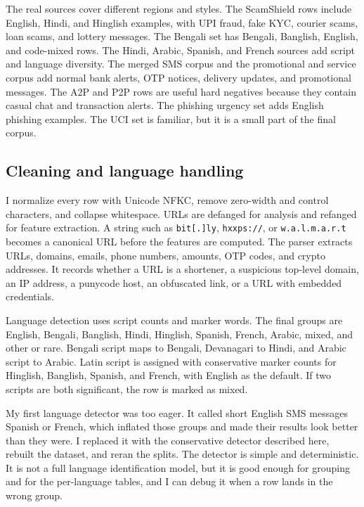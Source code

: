 \documentclass[11pt]{article}
\begin{document}
The real sources cover different regions and styles. The ScamShield rows include English, Hindi, and Hinglish examples, with UPI fraud, fake KYC, courier scams, loan scams, and lottery messages. The Bengali set has Bengali, Banglish, English, and code-mixed rows. The Hindi, Arabic, Spanish, and French sources add script and language diversity. The merged SMS corpus and the promotional and service corpus add normal bank alerts, OTP notices, delivery updates, and promotional messages. The A2P and P2P rows are useful hard negatives because they contain casual chat and transaction alerts. The phishing urgency set adds English phishing examples. The UCI set is familiar, but it is a small part of the final corpus.

\subsection{Cleaning and language handling}

I normalize every row with Unicode NFKC, remove zero-width and control characters, and collapse whitespace. URLs are defanged for analysis and refanged for feature extraction. A string such as \texttt{bit[.]ly}, \texttt{hxxps://}, or \texttt{w.a.l.m.a.r.t} becomes a canonical URL before the features are computed. The parser extracts URLs, domains, emails, phone numbers, amounts, OTP codes, and crypto addresses. It records whether a URL is a shortener, a suspicious top-level domain, an IP address, a punycode host, an obfuscated link, or a URL with embedded credentials.

Language detection uses script counts and marker words. The final groups are English, Bengali, Banglish, Hindi, Hinglish, Spanish, French, Arabic, mixed, and other or rare. Bengali script maps to Bengali, Devanagari to Hindi, and Arabic script to Arabic. Latin script is assigned with conservative marker counts for Hinglish, Banglish, Spanish, and French, with English as the default. If two scripts are both significant, the row is marked as mixed.

My first language detector was too eager. It called short English SMS messages Spanish or French, which inflated those groups and made their results look better than they were. I replaced it with the conservative detector described here, rebuilt the dataset, and reran the splits. The detector is simple and deterministic. It is not a full language identification model, but it is good enough for grouping and for the per-language tables, and I can debug it when a row lands in the wrong group.
\end{document}
